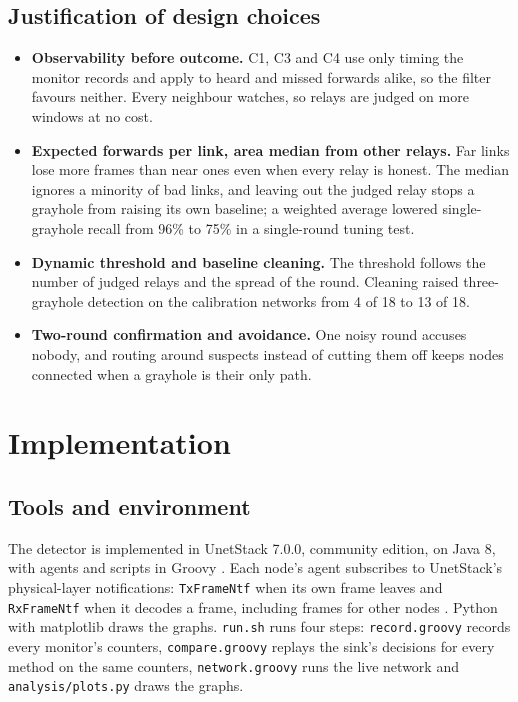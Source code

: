 \documentclass{article}
\begin{document}
\subsection{Justification of design choices}\label{sec:justify}
\begin{itemize}
  \item \textbf{Observability before outcome.} C1, C3 and C4 use only timing the monitor records and apply to heard and missed forwards alike, so the filter favours neither. Every neighbour watches, so relays are judged on more windows at no cost.
  \item \textbf{Expected forwards per link, area median from other relays.} Far links lose more frames than near ones even when every relay is honest. The median ignores a minority of bad links, and leaving out the judged relay stops a grayhole from raising its own baseline; a weighted average lowered single-grayhole recall from 96\% to 75\% in a single-round tuning test.
  \item \textbf{Dynamic threshold and baseline cleaning.} The threshold follows the number of judged relays and the spread of the round. Cleaning raised three-grayhole detection on the calibration networks from 4 of 18 to 13 of 18.
  \item \textbf{Two-round confirmation and avoidance.} One noisy round accuses nobody, and routing around suspects instead of cutting them off keeps nodes connected when a grayhole is their only path.
\end{itemize}

\section{Implementation}\label{sec:impl}

\subsection{Tools and environment}
\noindent
The detector is implemented in UnetStack 7.0.0, community edition, on Java 8, with agents and scripts in Groovy \cite{chitre2014}. Each node's agent subscribes to UnetStack's physical-layer notifications: \texttt{TxFrameNtf} when its own frame leaves and \texttt{RxFrameNtf} when it decodes a frame, including frames for other nodes \cite{unethandbook}. Python with matplotlib draws the graphs. \texttt{run.sh} runs four steps: \texttt{record.groovy} records every monitor's counters, \texttt{compare.groovy} replays the sink's decisions for every method on the same counters, \texttt{network.groovy} runs the live network and \texttt{analysis/plots.py} draws the graphs.
\end{document}
